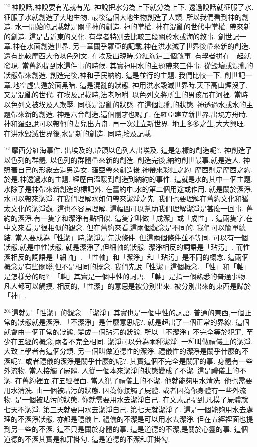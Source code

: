 \documentclass{book}
\begin{document}
$^{121}$神說話,神說要有光就有光.
神說把水分為上下就分為上下.
透過說話就征服了水.
征服了水就創造了大地生物.
最後這個大地生物創造了人類.
所以我們看到神的創造.
水一開始的記載就是關乎神的創造.
神的掌權.
神在混亂的世代中掌權.
帶來新的創造.
這是古近東的文化.
有學者特別去比較三段關於水或海的敘事.
創世記一章,神在水面創造世界.
另一章關乎羅亞的記載,神在洪水滅了世界後帶來新的創造.
還有比較摩西大令以色列文.
在埃及出現時,分紅海這三個敘事.
有學者拼在一起就發現.
當舊約提到水這件事的時候.
其實神用水的主題帶來三件事.
從毀壞或混亂的狀態帶來創造.
創造完後,神和子民納約.
這是並行的主題.
我們比較一下.
創世記一章,地空虛雲遁於面黑暗.
這是混亂的狀態.
神用洪水毀滅世界時,天下高山煙沒了.
又是混亂的世代.
在埃及記載時,法老吩咐.
以色列文將所生的男孩吊在河裡.
當時以色列文被埃及人欺壓.
同樣是混亂的狀態.
在這個混亂的狀態.
神透過水或水的主題帶來新的創造.
神是六合創造,這個剛才也說了.
在羅亞建立新世界,出現方舟時.
神和羅亞說可以帶他的妻兒出方舟.
再一次建立新世界.
地上多多之生,大大興旺.
在洪水毀滅世界後,水是新的創造.
同時,埃及記載.

$^{161}$摩西分紅海事件.
出埃及的,帶領以色列人出埃及.
這是怎樣的創造呢?.
神創造了以色列的群體.
以色列的群體帶來新的創造.
創造完後,納約創世最事,就是造人.
神照著自己的形象去造男造女.
羅亞帶來創造後,神帶來彩虹之約.
摩西則是摩西之約.
於是,神透過水的主題.
經歷由溫暖到創造到納約的事件.
這就是水的其中一個主題.
水除了是神帶來新創造的標記外.
在舊約中,水的第二個用途或作用.
就是關於潔淨.
水可以帶來潔淨.
在我們理解水如何帶來潔淨之先.
我們也要理解在舊約文化和猶太文化的潔淨觀.
這也不容易理解.
這幅圖可以幫助我們理解潔淨是甚麼一回事.
舊約的潔淨,有一隻字和潔淨有點相似.
這隻字叫做「成潔」或「成性」.
這兩隻字,在中文來看,是很相似的觀念.
但在舊約來看,這兩個觀念是不同的.
我們可以簡單總結.
當人要成為「性潔」時,潔淨是先決條件.
但這兩個條件並不等同.
可以有一個狀態,就是中性狀態.
就是潔淨了,但細軸的狀態.
潔淨相反的詞語是「玷污」.
而性潔相反的詞語是「細軸」.
「性軸」和「潔淨」和「玷污」是不同的概念.
這兩個概念是有些關聯,但不是相同的概念.
我們先說「性潔」這個概念.
「性」和「軸」是怎樣分的呢?.
「軸」其實是一個中性的詞語.
「軸」是指一個熟悉的普通事物.
凡人都可以觸摸.
相反的,「性潔」的意思是被分別出來.
被分別出來的東西是歸於「神」.

$^{201}$這就是「性潔」的觀念.
「潔淨」其實也是一個中性的詞語.
普通的東西,一個正常的狀態就是潔淨.
「不潔淨」是什麼意思呢?.
就是超出了一個正常的界線.
這個就會由一個正常的狀態.
變成一個玷污的狀態.
所以「不潔淨」不完全等於犯罪.
至少在五經的概念,兩者不完全相同.
潔淨可以分為兩種潔淨.
一種叫做禮儀上的潔淨.
大致上學者有這個分類.
另一個叫做道德性的潔淨.
禮儀性的潔淨是關乎什麼的不潔呢?.
或者禮儀的潔淨是關乎什麼的呢?.
其實這個不完全是關罪的事.
身體有一些外流物.
當人接觸了屍體.
人從一個本來潔淨的狀態變成了不潔.
這是禮儀上的不潔.
在舊約裡面,在五經裡面.
當人犯了禮儀上的不潔.
他就能夠用水清洗.
他也需要用水清洗.
由一個被玷污的狀態.
因為你接觸了屍體.
或者因為你身體有一些外流物.
是一個被玷污的狀態.
你就需要用水去潔淨自己.
在文素記提到,凡摸了屍體就七天不潔淨.
第三天就要用水去潔淨自己.
第七天就潔淨了.
這是一個能夠用水去處理的不潔淨狀態.
亦都是禮儀上.
禮儀的不潔是可以用水去潔淨.
但在五經裡面也提到另一些的不潔.
這不只是關於身體的事.
這是道德的不潔,是關於心靈的事.
這個道德的不潔其實是和罪掛勾.
這是道德的不潔和罪掛勾.
\end{document}
